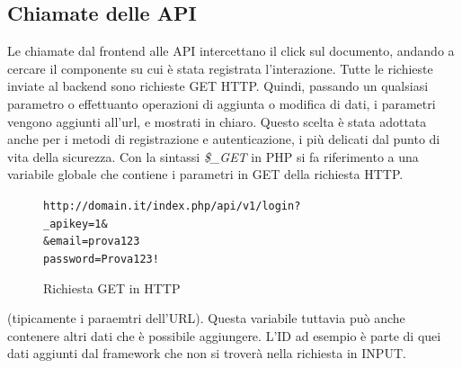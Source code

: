 \subsection{Chiamate delle API}
Le chiamate dal frontend alle API intercettano il click sul documento, andando a cercare il componente su cui è stata registrata l'interazione. Tutte le richieste inviate al backend sono richieste GET HTTP. Quindi, passando un qualsiasi parametro o effettuanto operazioni di aggiunta o modifica di dati, i parametri vengono aggiunti all'url, e mostrati in chiaro. Questo scelta è stata adottata anche per i metodi di registrazione e autenticazione, i più delicati dal punto di vita della sicurezza. Con la sintassi \textsl{\$\_GET} in PHP si fa riferimento a una variabile globale che contiene i parametri in GET della richiesta HTTP.
\begin{figure}[H]
\begin{alltt}
    \centering
    http://domain.it/index.php/api/v1/login?
    \centering
    _apikey=1&
    &email=prova123%
    password=Prova123!
\end{alltt}
\caption{Richiesta GET in HTTP}
\end{figure}

(tipicamente i paraemtri dell'URL). Questa variabile tuttavia può anche contenere altri dati che è possibile aggiungere. L'ID ad esempio è parte di quei dati aggiunti dal framework che non si troverà nella richiesta in INPUT.





